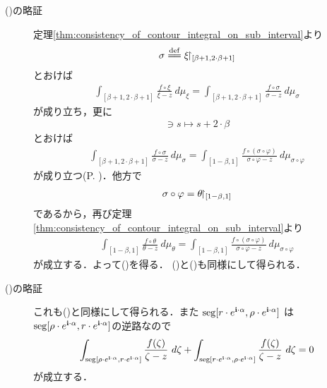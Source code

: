 \begin{description}
		\item[()の略証]	
			定理\ref{thm:consistency_of_contour_integral_on_sub_interval}より
			\begin{align}
				\sigma \defeq \xi \rest_{[\beta+1,2\cdot\beta+1]}
			\end{align}
			とおけば
			\begin{align}
				\int_{[\beta+1,2\cdot\beta+1]} \frac{f \circ \xi}{\xi - z}\ d\mu_{\xi}
				= \int_{[\beta+1,2\cdot\beta+1]} \frac{f \circ \sigma}{\sigma - z}\ d\mu_{\sigma}
			\end{align}
			が成り立ち，更に
			\begin{align}
				[0,1] \ni s \longmapsto s + 2 \cdot \beta
			\end{align}
			とおけば
			\begin{align}
				\int_{[\beta+1,2\cdot\beta+1]} \frac{f \circ \sigma}{\sigma - z}\ d\mu_{\sigma}
				= \int_{[1-\beta,1]} \frac{f \circ (\sigma \circ \varphi)}{\sigma \circ \varphi - z}\ d\mu_{\sigma \circ \varphi}
			\end{align}
			が成り立つ(P. \pageref{fom:change_of_parameter_interval_complex_contour_integral})．他方で
			\begin{align}
				\sigma \circ \varphi = \theta \hspace{-0.41em}\upharpoonright_{[1-\beta,1]}
			\end{align}
			であるから，再び定理\ref{thm:consistency_of_contour_integral_on_sub_interval}より
			\begin{align}
				\int_{[1-\beta,1]} \frac{f \circ \theta}{\theta - z}\ d\mu_{\theta}
				= \int_{[1-\beta,1]} \frac{f \circ (\sigma \circ \varphi)}{\sigma \circ \varphi - z}\ d\mu_{\sigma \circ \varphi}
			\end{align}
			が成立する．よって()を得る．
			()と()も同様にして得られる．
			
		\item[()の略証]
			これも()と同様にして得られる．また
			$\operatorname{seg}[r \cdot e^{\mathbf{i} \cdot \alpha},\rho \cdot e^{\mathbf{i} \cdot \alpha}]$
			は$\operatorname{seg}[\rho \cdot e^{\mathbf{i} \cdot \alpha},r \cdot e^{\mathbf{i} \cdot \alpha}]$の逆路なので
			\begin{align}
				\int_{\operatorname{seg}[\rho \cdot e^{\mathbf{i} \cdot \alpha},r \cdot e^{\mathbf{i} \cdot \alpha}]} \frac{f(\zeta)}{\zeta - z}\ d\zeta
				+ \int_{\operatorname{seg}[r \cdot e^{\mathbf{i} \cdot \alpha},\rho \cdot e^{\mathbf{i} \cdot \alpha}]} \frac{f(\zeta)}{\zeta - z}\ d\zeta 
				= 0
			\end{align}
			が成立する．
			\QED
	\end{description}
	
